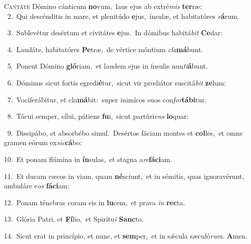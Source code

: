 \lettrine{\initial\textcolor{\initialcolor}{C}}{antáte} Dómino cánticum \textbf{no}\-vum,~\star laus ejus ab extré\textit{mis} \textbf{ter}\-ræ:\\
{\numbfont\textcolor{\numbcolor}{~2.}}~Qui descénditis in mare, et plenitúdo \textbf{e}\-jus,~\star ínsulæ, et habitatóres \textit{e}\-\textbf{á}rum.\par
{\numbfont\textcolor{\numbcolor}{~3.}}~Sublevétur desértum et civitátes \textbf{e}\-jus.~\star In dómibus habitá\textit{bit} \textbf{Ce}\-dar:\par
{\numbfont\textcolor{\numbcolor}{~4.}}~Laudáte, habitatóres \textbf{Pe}\-træ,~\star de vértice móntium \textit{cla}\-\textbf{má}bunt.\par
{\numbfont\textcolor{\numbcolor}{~5.}}~Ponent Dómino \textbf{gló}\-riam,~\star et laudem ejus in ínsulis nun\-\textit{ti}\-\textbf{á}bunt.\par
{\numbfont\textcolor{\numbcolor}{~6.}}~Dóminus sicut fortis egredi\-\textbf{é}\-tur,~\star sicut vir prœliátor suscitá\textit{bit} \textbf{ze}\-lum:\par
{\numbfont\textcolor{\numbcolor}{~7.}}~Vociferábitur, et cla\-\textbf{má}\-bit:~\star super inimícos suos con\-\textit{for}\-\textbf{tá}\textbf{bi}tur.\par
{\numbfont\textcolor{\numbcolor}{~8.}}~Tácui semper, sílui, pátiens \textbf{fu}\-i,~\star sicut partúri\textit{ens} \textbf{lo}\-quar:\par
{\numbfont\textcolor{\numbcolor}{~9.}}~Dissipábo, et absorbébo simul.~\dagger Desértos fáciam montes et \textbf{col}\-les,~\star et omne gramen eórum ex\-\textit{sic}\-\textbf{cá}bo:\par
{\numbfont\textcolor{\numbcolor}{10.}}~Et ponam flúmina in \textbf{ín}\-sulas,~\star et stagna a\-\textit{re}\-\textbf{fá}\textbf{ci}am.\par
{\numbfont\textcolor{\numbcolor}{11.}}~Et ducam cæcos in viam, quam \textbf{né}\-sciunt,~\star et in sémitis, quas ignoravérunt, ambuláre e\textit{os} \textbf{fá}\-\textbf{ci}am:\par
{\numbfont\textcolor{\numbcolor}{12.}}~Ponam ténebras coram eis in \textbf{lu}\-cem,~\star et prava \textit{in} \textbf{rec}\-ta.\par
{\numbfont\textcolor{\numbcolor}{13.}}~Glória Patri, et \textbf{Fí}\-lio,~\star et Spirítu\textit{i} \textbf{Sanc}\-to.\par
{\numbfont\textcolor{\numbcolor}{14.}}~Sicut erat in princípio, et nunc, et \textbf{sem}\-per,~\star et in sǽcula sæculó\-\textit{rum}\-. \textbf{A}\-men.\par
